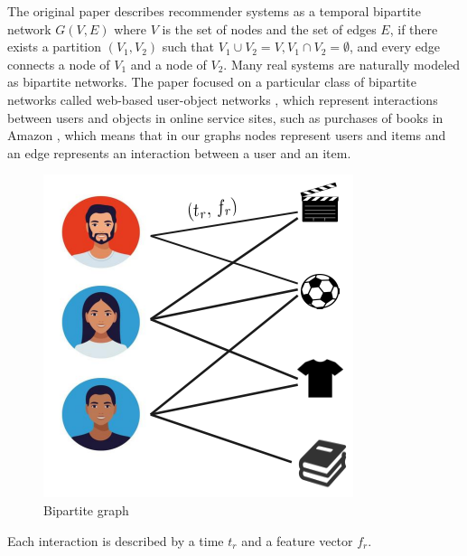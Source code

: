 The original paper describes recommender systems as a temporal bipartite network { \color{blue} $G(V, E)$  where $V$ is the set of nodes and the set of edges $E$, if there exists a partition $\left(V_1, V_2\right)$ such that $V_1 \cup V_2=V, V_1 \cap V_2=\emptyset$, and every edge connects a node of $V_1$ and a node of $V_2$. Many real systems are naturally modeled as bipartite networks. The paper focused on a particular class of bipartite networks called web-based user-object networks \supercite{Shang_2010}, which represent interactions between users and objects in online service sites, such as purchases of books in Amazon \supercite{L__2012}, which means that in our graphs  nodes  represent users and items and an edge  represents an interaction between a user and an item.}

\begin{figure}[H]
    \centering
    \includegraphics[scale = 0.35]{image/bipartite_graph.png}
    \caption{Bipartite graph}
    \label{bipartite_graph}
\end{figure}
Each interaction is described by a time $t_r$ and a feature vector $f_r$.\\

